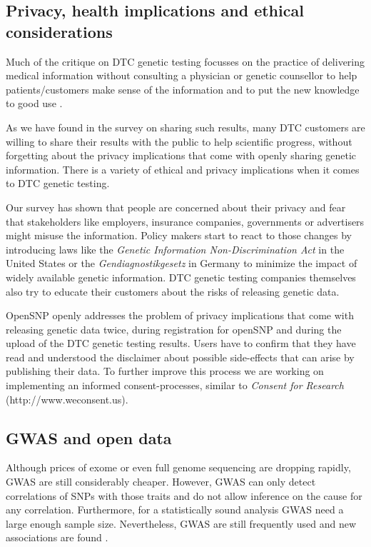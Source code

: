 \documentclass[10pt]{article}
\begin{document}
\subsection*{Privacy, health implications and ethical considerations}

Much of the critique on DTC genetic testing focusses on the practice 
of delivering medical information without consulting a physician or genetic counsellor to help patients/customers make sense of the information 
and to put the new knowledge to good use \cite{Hauskeller2011,Hogarth2008,Wasson2009}.  

As we have found in the survey on sharing such results, many DTC customers are willing to share their results with the public to help scientific progress, without forgetting about the privacy implications that come with openly sharing genetic information. There is a variety of ethical and privacy implications when it comes to DTC genetic testing\cite{Caulfield2011,Joh2011}. 

Our survey has shown that people are concerned about their privacy and fear that stakeholders like employers, insurance companies, governments 
or advertisers might misuse the information. Policy makers start to react to those changes by introducing laws like the 
\textit{Genetic Information Non-Discrimination Act} in the United States or the \emph{Gendiagnostikgesetz} in Germany to minimize the impact of
widely available genetic information. DTC genetic testing companies themselves also try to educate their customers about the risks of releasing genetic data.  

OpenSNP openly addresses the problem of privacy implications that come with releasing genetic data twice, during registration for openSNP and during 
the upload of the DTC genetic testing results. Users have to confirm that they have read and understood the disclaimer about possible side-effects 
that can arise by publishing their data. To further improve this process we are working on implementing an informed consent-processes,
similar to \textit{Consent for Research} (http://www.weconsent.us).

\subsection*{GWAS and open data}
Although prices of exome or even full genome sequencing are dropping rapidly, GWAS are still considerably cheaper. However, GWAS can only detect correlations of SNPs with those traits and do not allow 
inference on the cause for any correlation. Furthermore, for a statistically sound analysis GWAS need a large enough sample size. Nevertheless, GWAS are still frequently used and new associations are found \cite{10.1371.journal.pone.0031470,10.1371.journal.pone.0030309,10.1371.journal.pone.0029848}. 
\end{document}
